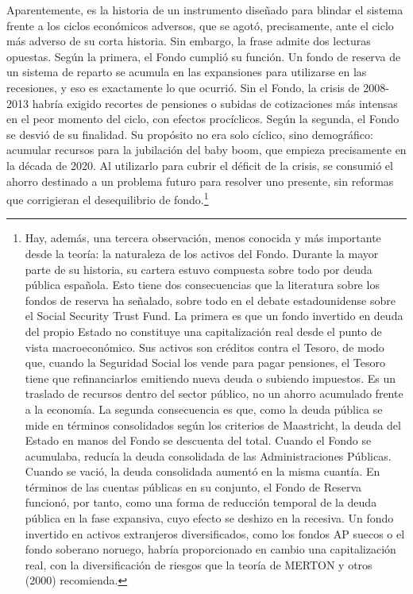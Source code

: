 \documentclass[10pt,a4paper]{article}
\begin{document}
Aparentemente, es la historia de un instrumento diseñado para blindar el sistema frente a los ciclos económicos adversos, que se agotó, precisamente, ante el ciclo más adverso de su corta historia. Sin embargo, la frase admite dos lecturas opuestas. Según la primera, el Fondo cumplió su función. Un fondo de reserva de un sistema de reparto se acumula en las expansiones para utilizarse en las recesiones, y eso es exactamente lo que ocurrió. Sin el Fondo, la crisis de 2008-2013 habría exigido recortes de pensiones o subidas de cotizaciones más intensas en el peor momento del ciclo, con efectos procíclicos. Según la segunda, el Fondo se desvió de su finalidad. Su propósito no era solo cíclico, sino demográfico: acumular recursos para la jubilación del baby boom, que empieza precisamente en la década de 2020. Al utilizarlo para cubrir el déficit de la crisis, se consumió el ahorro destinado a un problema futuro para resolver uno presente, sin reformas que corrigieran el desequilibrio de fondo.\footnote{Hay, además, una tercera observación, menos conocida y más importante desde la teoría: la naturaleza de los activos del Fondo. Durante la mayor parte de su historia, su cartera estuvo compuesta sobre todo por deuda pública española. Esto tiene dos consecuencias que la literatura sobre los fondos de reserva ha señalado, sobre todo en el debate estadounidense sobre el Social Security Trust Fund. La primera es que un fondo invertido en deuda del propio Estado no constituye una capitalización real desde el punto de vista macroeconómico. Sus activos son créditos contra el Tesoro, de modo que, cuando la Seguridad Social los vende para pagar pensiones, el Tesoro tiene que refinanciarlos emitiendo nueva deuda o subiendo impuestos. Es un traslado de recursos dentro del sector público, no un ahorro acumulado frente a la economía. La segunda consecuencia es que, como la deuda pública se mide en términos consolidados según los criterios de Maastricht, la deuda del Estado en manos del Fondo se descuenta del total. Cuando el Fondo se acumulaba, reducía la deuda consolidada de las Administraciones Públicas. Cuando se vació, la deuda consolidada aumentó en la misma cuantía. En términos de las cuentas públicas en su conjunto, el Fondo de Reserva funcionó, por tanto, como una forma de reducción temporal de la deuda pública en la fase expansiva, cuyo efecto se deshizo en la recesiva. Un fondo invertido en activos extranjeros diversificados, como los fondos AP suecos o el fondo soberano noruego, habría proporcionado en cambio una capitalización real, con la diversificación de riesgos que la teoría de MERTON y otros (2000) recomienda.
}
\end{document}
